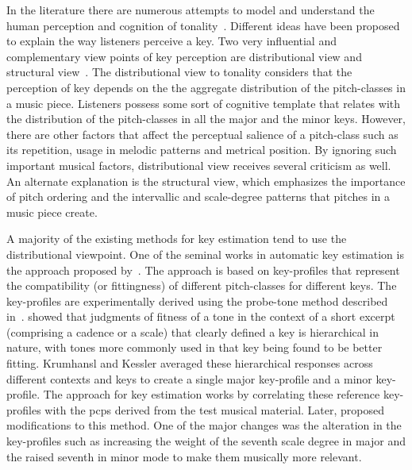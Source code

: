 In the literature there are numerous attempts to model and understand the human perception and cognition of tonality~\cite{longuet1971interpreting,krumhansl1979quantification,chew2000towards,krumhansl2000tonality,cohen1991tonality}. Different ideas have been proposed to explain the way listeners perceive a key. Two very influential and complementary view points of key perception are distributional view and structural view~\cite{Brown1988,temperley2008pitch}.  The distributional view to tonality considers that the perception of key depends on the the aggregate distribution of the pitch-classes in a music piece. Listeners possess some sort of cognitive template that relates with the distribution of the pitch-classes in all the major and the minor keys. However, there are other factors that affect the perceptual salience of a pitch-class such as its repetition, usage in melodic patterns and metrical position. By ignoring such important musical factors, distributional view receives several criticism as well. An alternate explanation is the structural view, which emphasizes the importance of pitch ordering and the intervallic and scale-degree patterns that pitches in a music piece create.

A majority of the existing methods for key estimation tend to use the distributional viewpoint. One of the seminal works in automatic key estimation is the approach proposed by~\cite{KrumhanslKessler82,krumhansl2001cognitive}. The approach is based on key-profiles that represent the compatibility (or fittingness) of different pitch-classes for different keys. The key-profiles are experimentally derived using the probe-tone method described in~\cite{krumhansl1979quantification}. \cite{krumhansl1979quantification} showed that judgments of fitness of a tone in the context of a short excerpt (comprising a cadence or a scale) that clearly defined a key is hierarchical in nature, with tones more commonly used in that key being found to be better fitting. Krumhansl and Kessler averaged these hierarchical responses across different contexts and keys to create a single major key-profile and a minor key-profile. The approach for key estimation works by correlating these reference key-profiles with the \glspl{pcp} derived from the test musical material. Later, \cite{temperley1999s} proposed modifications to this method. One of the major changes was the alteration in the key-profiles such as increasing the weight of the seventh scale degree in major and the raised seventh in minor mode to make them musically more relevant. 

